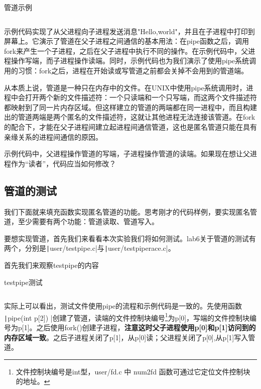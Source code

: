 \begin{codeBoxWithCaption}{管道示例\label{code:test_pipe.c}}
	\inputminted[linenos]{c}{codes/test_pipe.c}
\end{codeBoxWithCaption}

示例代码实现了从父进程向子进程发送消息"Hello,world"，并且在子进程中打印到屏幕上。它演示了管道在父子进程之间通信的基本用法：在pipe函数之后，调用fork来产生一个子进程，之后在父子进程中执行不同的操作。在示例代码中，父进程操作写端，而子进程操作读端。同时，示例代码也为我们演示了使用pipe系统调用的习惯：fork之后，进程在开始读或写管道之前都会关掉不会用到的管道端。

从本质上说，管道是一种只在内存中的文件。在UNIX中使用pipe系统调用时，进程中会打开两个新的文件描述符：一个只读端和一个只写端，而这两个文件描述符都映射到了同一片内存区域。但这样建立的管道的两端都在同一进程中，而且构建出的管道两端是两个匿名的文件描述符，这就让其他进程无法连接该管道。在fork的配合下，才能在父子进程间建立起进程间通信管道，这也是匿名管道只能在具有亲缘关系的进程间通信的原因。

\begin{thinking}\label{think-father-reader}
	示例代码中，父进程操作管道的写端，子进程操作管道的读端。如果现在想让父进程作为“读者”，代码应当如何修改？
\end{thinking}

\subsection{管道的测试}

我们下面就来填充函数实现匿名管道的功能。思考刚才的代码样例，要实现匿名管道，至少需要有两个功能：管道读取、管道写入。

要想实现管道，首先我们来看看本次实验我们将如何测试。lab6关于管道的测试有两个，分别是\texttt|user/testpipe.c|与\texttt|user/testpiperace.c|。

首先我们来观察testpipe的内容

\begin{codeBoxWithCaption}{testpipe测试\label{code:lab_test_pipe.c}}
	\inputminted[linenos]{c}{codes/lab_test_pipe.c}
\end{codeBoxWithCaption}

实际上可以看出，测试文件使用pipe的流程和示例代码是一致的。先使用函数 \texttt|pipe(int p[2]) |创建了管道，读端的文件控制块编号\footnote{文件控制块编号是int型，user/fd.c 中 num2fd 函数可通过它定位文件控制块的地址。}为p[0]，写端的文件控制块编号为p[1]。之后使用fork()创建子进程，\textbf{注意这时父子进程使用p[0]和p[1]访问到的内存区域一致}。之后子进程关闭了p[1]，从p[0]读；父进程关闭了p[0],从p[1]写入管道。

